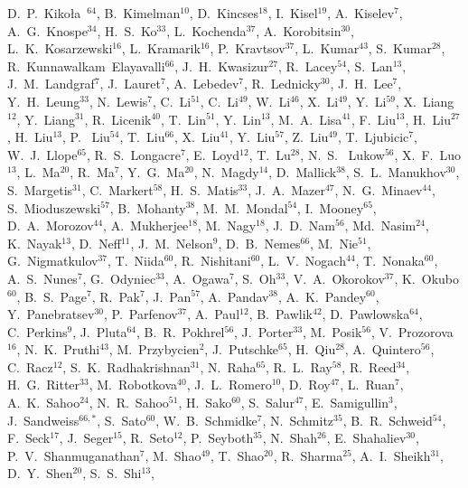 {D.~P.~Kiko\l{}a~$^{64}$,
B.~Kimelman$^{10}$,
D.~Kincses$^{18}$,
I.~Kisel$^{19}$,
A.~Kiselev$^{7}$,
A.~G.~Knospe$^{34}$,
H.~S.~Ko$^{33}$,
L.~Kochenda$^{37}$,
A.~Korobitsin$^{30}$,
L.~K.~Kosarzewski$^{16}$,
L.~Kramarik$^{16}$,
P.~Kravtsov$^{37}$,
L.~Kumar$^{43}$,
S.~Kumar$^{28}$,
R.~Kunnawalkam~Elayavalli$^{66}$,
J.~H.~Kwasizur$^{27}$,
R.~Lacey$^{54}$,
S.~Lan$^{13}$,
J.~M.~Landgraf$^{7}$,
J.~Lauret$^{7}$,
A.~Lebedev$^{7}$,
R.~Lednicky$^{30}$,
J.~H.~Lee$^{7}$,
Y.~H.~Leung$^{33}$,
N.~Lewis$^{7}$,
C.~Li$^{51}$,
C.~Li$^{49}$,
W.~Li$^{46}$,
X.~Li$^{49}$,
Y.~Li$^{59}$,
X.~Liang$^{12}$,
Y.~Liang$^{31}$,
R.~Licenik$^{40}$,
T.~Lin$^{51}$,
Y.~Lin$^{13}$,
M.~A.~Lisa$^{41}$,
F.~Liu$^{13}$,
H.~Liu$^{27}$,
H.~Liu$^{13}$,
P.~ Liu$^{54}$,
T.~Liu$^{66}$,
X.~Liu$^{41}$,
Y.~Liu$^{57}$,
Z.~Liu$^{49}$,
T.~Ljubicic$^{7}$,
W.~J.~Llope$^{65}$,
R.~S.~Longacre$^{7}$,
E.~Loyd$^{12}$,
T.~Lu$^{28}$,
N.~S.~ Lukow$^{56}$,
X.~F.~Luo$^{13}$,
L.~Ma$^{20}$,
R.~Ma$^{7}$,
Y.~G.~Ma$^{20}$,
N.~Magdy$^{14}$,
D.~Mallick$^{38}$,
S.~L.~Manukhov$^{30}$,
S.~Margetis$^{31}$,
C.~Markert$^{58}$,
H.~S.~Matis$^{33}$,
J.~A.~Mazer$^{47}$,
N.~G.~Minaev$^{44}$,
S.~Mioduszewski$^{57}$,
B.~Mohanty$^{38}$,
M.~M.~Mondal$^{54}$,
I.~Mooney$^{65}$,
D.~A.~Morozov$^{44}$,
A.~Mukherjee$^{18}$,
M.~Nagy$^{18}$,
J.~D.~Nam$^{56}$,
Md.~Nasim$^{24}$,
K.~Nayak$^{13}$,
D.~Neff$^{11}$,
J.~M.~Nelson$^{9}$,
D.~B.~Nemes$^{66}$,
M.~Nie$^{51}$,
G.~Nigmatkulov$^{37}$,
T.~Niida$^{60}$,
R.~Nishitani$^{60}$,
L.~V.~Nogach$^{44}$,
T.~Nonaka$^{60}$,
A.~S.~Nunes$^{7}$,
G.~Odyniec$^{33}$,
A.~Ogawa$^{7}$,
S.~Oh$^{33}$,
V.~A.~Okorokov$^{37}$,
K.~Okubo$^{60}$,
B.~S.~Page$^{7}$,
R.~Pak$^{7}$,
J.~Pan$^{57}$,
A.~Pandav$^{38}$,
A.~K.~Pandey$^{60}$,
Y.~Panebratsev$^{30}$,
P.~Parfenov$^{37}$,
A.~Paul$^{12}$,
B.~Pawlik$^{42}$,
D.~Pawlowska$^{64}$,
C.~Perkins$^{9}$,
J.~Pluta$^{64}$,
B.~R.~Pokhrel$^{56}$,
J.~Porter$^{33}$,
M.~Posik$^{56}$,
V.~Prozorova$^{16}$,
N.~K.~Pruthi$^{43}$,
M.~Przybycien$^{2}$,
J.~Putschke$^{65}$,
H.~Qiu$^{28}$,
A.~Quintero$^{56}$,
C.~Racz$^{12}$,
S.~K.~Radhakrishnan$^{31}$,
N.~Raha$^{65}$,
R.~L.~Ray$^{58}$,
R.~Reed$^{34}$,
H.~G.~Ritter$^{33}$,
M.~Robotkova$^{40}$,
J.~L.~Romero$^{10}$,
D.~Roy$^{47}$,
L.~Ruan$^{7}$,
A.~K.~Sahoo$^{24}$,
N.~R.~Sahoo$^{51}$,
H.~Sako$^{60}$,
S.~Salur$^{47}$,
E.~Samigullin$^{3}$,
J.~Sandweiss$^{66,*}$,
S.~Sato$^{60}$,
W.~B.~Schmidke$^{7}$,
N.~Schmitz$^{35}$,
B.~R.~Schweid$^{54}$,
F.~Seck$^{17}$,
J.~Seger$^{15}$,
R.~Seto$^{12}$,
P.~Seyboth$^{35}$,
N.~Shah$^{26}$,
E.~Shahaliev$^{30}$,
P.~V.~Shanmuganathan$^{7}$,
M.~Shao$^{49}$,
T.~Shao$^{20}$,
R.~Sharma$^{25}$,
A.~I.~Sheikh$^{31}$,
D.~Y.~Shen$^{20}$,
S.~S.~Shi$^{13}$,
}
